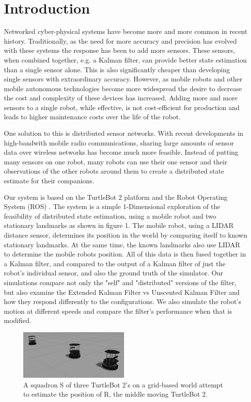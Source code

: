 \documentclass[conference]{IEEEtran} \usepackage[T1]{fontenc} \usepackage[backend=biber, style=ieee]{biblatex}
\begin{document}
\section{Introduction} \label{Introduction}
Networked cyber-physical systems have become more and more common in recent history. Traditionally, as the need for more
accuracy and precision has evolved with these systems the response has been to add more sensors. These sensors, when
combined together, e.g. a Kalman filter, can provide better state estimation than a single sensor alone. This is also
significantly cheaper than developing single sensors with extraordinary accuracy. However, as mobile robots and other
mobile autonomous technologies become more widespread the desire to decrease the cost and complexity of these devices
has increased. Adding more and more sensors to a single robot, while effective, is not cost-efficient for production and
leads to higher maintenance costs over the life of the robot.

One solution to this is distributed sensor networks. With recent developments in high-bandwith mobile radio
communications, sharing large amounts of sensor data over wireless networks has become much more feasible. Instead of
putting many sensors on one robot, many robots can use their one sensor and their observations of the other robots
around them to create a distributed state estimate for their companions.

Our system is based on the TurtleBot 2 platform and the Robot Operating System (ROS) \cite{ros_original}. The system is a simple 1-Dimensional exploration of the feasibility of distributed state estimation, using a mobile robot and two stationary landmarks as shown in figure 1. The mobile robot, using a LIDAR distance sensor, determines its position in the world by comparing itself to known stationary landmarks. At the same time, the known landmarks also use LIDAR to determine the mobile robots position. All of this data is then fused together in a Kalman filter, and compared to the output of a Kalman filter of just the robot's individual sensor, and also the ground truth of the simulator. Our simulations compare not only the "self" and "distributed" versions of the filter, but also examine the Extended Kalman Filter vs Unscented Kalman Filter and how they respond differently to the configurations. We also simulate the robot's motion at different speeds and compare the filter's performance when that is modified.

\begin{figure}
\label{pic1} 
\centering 
\includegraphics[width=0.49\textwidth]{sim1}
\caption{A squadron S of three TurtleBot 2's on a grid-based world attempt to estimate the position of R, the middle moving TurtleBot 2.}
\end{figure}
\end{document}
